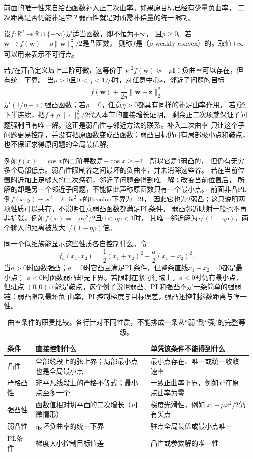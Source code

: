 前面的唯一性来自给凸函数补入正二次曲率。如果原目标已经有少量负曲率，
二次距离是否仍能补足它？弱凸性就是对所需补偿量的统一限制。
\begin{definition}[欧氏空间中的弱凸性]
\label{def:opt-weak-convexity}
设$f:\mathbb{R}^d\to\mathbb{R}\cup\{+\infty\}$是适当函数，即不恒为$+\infty$，
且$\rho\geq0$。若
$\bm{w}\mapsto f(\bm{w})+\rho\lVert\bm{w}\rVert_2^2/2$是凸函数，
则称$f$是（$\rho$-weakly convex）的。取值$+\infty$可以用来表示不可行点。
\end{definition}
若$f$在开凸定义域上二阶可微，这等价于
$\nabla^2f(\bm{w})\succeq-\rho\bm{I}$：负曲率可以存在，但有统一下界。
当$\rho>0$且$0<\eta<1/\rho$时，对任意中心$\bm{z}$，邻近子问题的目标
\[
  f(\bm{w})+\frac{1}{2\eta}\lVert\bm{w}-\bm{z}\rVert_2^2
\]
是$(1/\eta-\rho)$强凸函数；若$\rho=0$，任意$\eta>0$都具有同样的补足曲率作用。
若$f$还下半连续，把$f+\rho\|\cdot\|_2^2/2$代入本节的直接增长证明，
剩余正二次项就保证子问题强制且有唯一解。这正是弱凸性与邻近方法的联系。补入二次曲率
只让这个子问题更易控制，并没有把原函数变成凸函数；弱凸目标仍可有局部极小点和鞍点，
也不保证求得原问题的全局最优解。

例如$f(x)=\cos x$的二阶导数是$-\cos x\geq-1$，所以它是$1$弱凸的，
但仍有无穷多个局部低点。弱凸性限制谷之间最坏的负曲率，并未消除这些谷。
若在当前位置附近加上足够大的二次惩罚，邻近子问题会得到唯一解；改变当前位置后，
所解的却是另一个邻近子问题，不能据此声称原函数只有一个最小点。
前面非凸PL例$f(x,y)=x^2+2\sin^2x$的Hessian下界为$-2\bm I$，
因此它也为$2$弱凸；这只说明两项性质可以共存，不说明任意弱凸函数都满足PL条件。
弱凸邻近映射一般也不再非扩张。例如$f(x)=-\rho x^2/2$且$0<\eta\rho<1$时，
其唯一邻近解为$z/(1-\eta\rho)$，两个输入的距离被放大$1/(1-\eta\rho)$倍。

同一个低维族能显示这些性质各自控制什么。令
\[
  f_a(x_1,x_2)=\frac12(x_1+x_2)^2+\frac{a}{2}(x_1-x_2)^2.
\]
当$a>0$时函数强凸；$a=0$时它凸且满足PL条件，但整条直线$x_1+x_2=0$都是最小点；
$a<0$时函数弱凸却无下界。若限制在紧可行域上，$a<0$时仍有最小点，但驻点
$(0,0)$可能是鞍点。这个例子说明弱凸、PL和强凸不是一条简单的强弱链：弱凸限制最坏负
曲率，PL控制梯度与目标误差，强凸还控制参数距离与唯一性。

\begin{table}[htbp]
 \centering\small
 \begin{tabularx}{\linewidth}{@{}lXX@{}}
 \toprule
 条件 & 直接控制什么 & 单凭该条件不能得到什么\\
 \midrule
 凸性 & 全部线段上的弦上界；局部最小点也是全局最小点 & 最小点存在、唯一或统一收敛速率\\
 严格凸性 & 非平凡线段上的严格不等式；最小点至多一个 & 一致正曲率下界，例如$x^4$在原点曲率为零\\
 强凸性 & 函数值相对切平面的二次增长（可微情形） & 梯度光滑性，例如$|x|+\mu x^2/2$仍有尖点\\
 弱凸性 & 最坏负曲率的统一下界 & 驻点全局最优或最小点唯一\\
 PL条件 & 梯度大小控制目标值差 & 凸性或参数解的唯一性\\
 \bottomrule
 \end{tabularx}
 \caption{曲率条件的职责比较。各行针对不同性质，不能排成一条从“弱”到“强”的完整等级。}
 \label{tab:opt-curvature-conditions}
\end{table}

